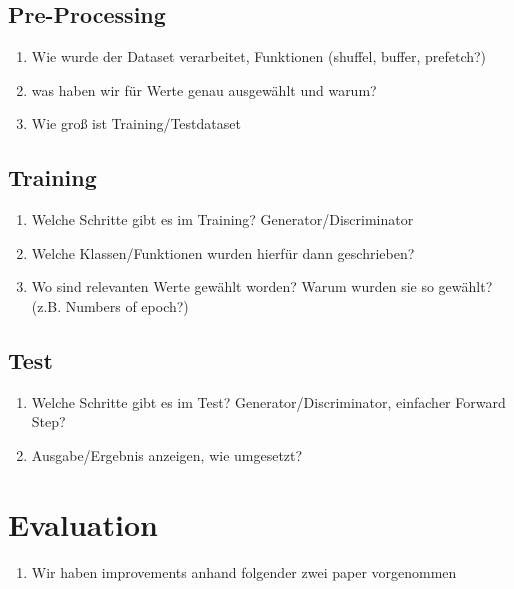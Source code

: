 \documentclass[fleqn,10pt]{SelfArx} %
\begin{document}
\subsection{Pre-Processing} 
\begin{enumerate}[noitemsep] %
	\item Wie wurde der Dataset verarbeitet, Funktionen (shuffel, buffer, prefetch?)
	\item was haben wir für Werte genau ausgewählt und warum?
	\item Wie groß ist Training/Testdataset
\end{enumerate}

\subsection{Training}
\begin{enumerate}[noitemsep] %
	\item Welche Schritte gibt es im Training? Generator/Discriminator
	\item Welche Klassen/Funktionen wurden hierfür dann geschrieben?
	\item Wo sind relevanten Werte gewählt worden? Warum wurden sie so gewählt?(z.B. Numbers of epoch?)
\end{enumerate}

\subsection{Test}
\begin{enumerate}[noitemsep] %
	\item Welche Schritte gibt es im Test? Generator/Discriminator, einfacher Forward Step?
	\item Ausgabe/Ergebnis anzeigen, wie umgesetzt?
\end{enumerate}

\section{Evaluation}
\begin{enumerate}[noitemsep] %
	\item Wir haben improvements anhand folgender zwei paper vorgenommen
\end{enumerate}
\end{document}
